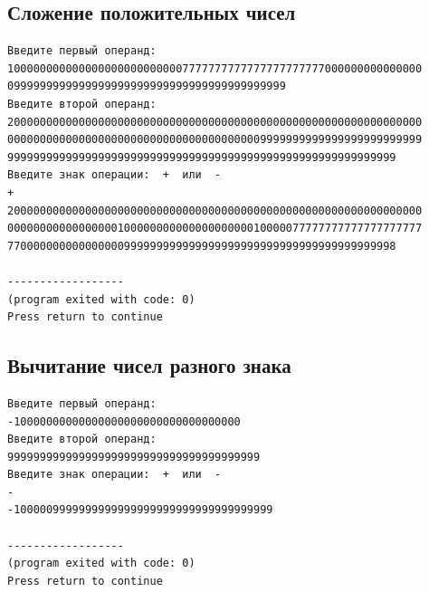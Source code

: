 \documentclass[a4paper,12pt]{article} %
\begin{document}
\subsection*{Сложение положительных чисел}
\begin{verbatim}
Введите первый операнд:
1000000000000000000000000007777777777777777777777000000000000000
0999999999999999999999999999999999999999999
Введите второй операнд:
2000000000000000000000000000000000000000000000000000000000000000
0000000000000000000000000000000000000009999999999999999999999999
999999999999999999999999999999999999999999999999999999999999
Введите знак операции:  +  или  -
+
2000000000000000000000000000000000000000000000000000000000000000
0000000000000000010000000000000000000010000077777777777777777777
770000000000000000999999999999999999999999999999999999999998

------------------
(program exited with code: 0)
Press return to continue
\end{verbatim}

\subsection*{Вычитание чисел разного знака}
\begin{verbatim}
Введите первый операнд:
-10000000000000000000000000000000000
Введите второй операнд:
999999999999999999999999999999999999999
Введите знак операции:  +  или  -
-
-1000009999999999999999999999999999999999

------------------
(program exited with code: 0)
Press return to continue
\end{verbatim}

\printbibliography
\end{document}
